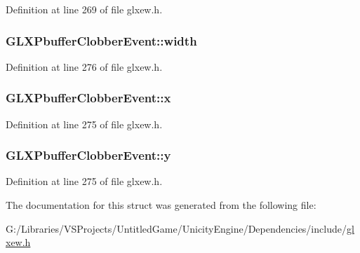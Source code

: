 Definition at line 269 of file glxew.\+h.

\hypertarget{struct_g_l_x_pbuffer_clobber_event_aaca375fecb872c73c60cd5d0bfc7c7a5}{}
\subsubsection[{width}]{ G\+L\+X\+Pbuffer\+Clobber\+Event\+::width}\label{struct_g_l_x_pbuffer_clobber_event_aaca375fecb872c73c60cd5d0bfc7c7a5}


Definition at line 276 of file glxew.\+h.

\hypertarget{struct_g_l_x_pbuffer_clobber_event_a8f0a7162a033c89ee94ce535580dbc32}{}
\subsubsection[{x}]{ G\+L\+X\+Pbuffer\+Clobber\+Event\+::x}\label{struct_g_l_x_pbuffer_clobber_event_a8f0a7162a033c89ee94ce535580dbc32}


Definition at line 275 of file glxew.\+h.

\hypertarget{struct_g_l_x_pbuffer_clobber_event_a69eb7ac60d36ac3ec4550ac206cfc61f}{}
\subsubsection[{y}]{ G\+L\+X\+Pbuffer\+Clobber\+Event\+::y}\label{struct_g_l_x_pbuffer_clobber_event_a69eb7ac60d36ac3ec4550ac206cfc61f}


Definition at line 275 of file glxew.\+h.



The documentation for this struct was generated from the following file\+:\begin{DoxyCompactItemize}
\item 
G\+:/\+Libraries/\+V\+S\+Projects/\+Untitled\+Game/\+Unicity\+Engine/\+Dependencies/include/\hyperlink{glxew_8h}{glxew.\+h}\end{DoxyCompactItemize}
